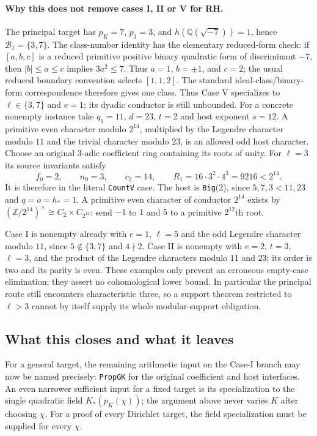 \paragraph{Why this does not remove cases I, II or V for RH.}
The principal target has $p_K=7$, $p_1=3$, and
$h(\mathbb Q(\sqrt{-7}))=1$, hence $\mathcal B_1=\{3,7\}$.
The class-number identity has the elementary reduced-form check:
if $[a,b,c]$ is a reduced primitive positive binary quadratic form
of discriminant $-7$, then $|b|\le a\le c$ implies
$3a^2\le7$.  Thus $a=1$, $b=\pm1$, and $c=2$; the usual reduced
boundary convention selects $[1,1,2]$.  The standard
ideal-class/binary-form correspondence therefore gives one class.
Thus Case V specializes to $\ell\in\{3,7\}$ and $e=1$;
its dyadic conductor is still unbounded.  For a concrete
nonempty instance take $q_1=11$, $d=23$, $t=2$ and host exponent
$s=12$.  A primitive even character modulo $2^{14}$, multiplied
by the Legendre character modulo $11$ and the trivial character
modulo $23$, is an allowed odd host character.  Choose an
original $3$-adic coefficient ring containing its roots of unity.
For $\ell=3$ its source invariants satisfy
\[
  f_0=2,\qquad n_0=3,\qquad c_2=14,\qquad
  R_1=16\cdot3^2\cdot4^3=9216<2^{14}.
 \tag{KA.18}
\]
It is therefore in the literal \texttt{CountV} case.  The host
is \texttt{Big}(2), since $5,7,3<11,23$ and $q=o=h_*=1$.
A primitive even character of conductor $2^{14}$ exists by
$(\mathbb Z/2^{14})^\times\cong C_2\times C_{2^{12}}$:
send $-1$ to $1$ and $5$ to a primitive $2^{12}$th root.

Case I is nonempty already with $e=1$, $\ell=5$ and the odd
Legendre character modulo $11$, since $5\notin\{3,7\}$ and
$4\nmid2$.  Case II is nonempty with $e=2$, $t=3$,
$\ell=3$, and the product of the Legendre characters modulo
$11$ and $23$; its order is two and its parity is even.
These examples only prevent an erroneous empty-case elimination;
they assert no cohomological lower bound.  In particular the
principal route still encounters characteristic three, so a
support theorem restricted to $\ell>3$ cannot by itself supply
its whole modular-support obligation.

\subsection{What this closes and what it leaves}

For a general target, the remaining arithmetic input on the
Case-I branch may now be named precisely:
\texttt{PropGK} for the original coefficient and host interfaces.
An even narrower sufficient input for a fixed target is its
specialization to the single quadratic field $K_*(p_K(\chi))$;
the argument above never varies $K$ after choosing $\chi$.
For a proof of every Dirichlet target, the field specialization
must be supplied for every $\chi$.

